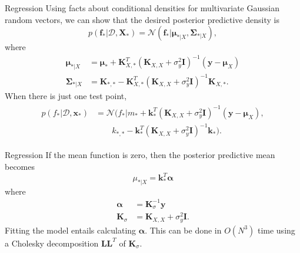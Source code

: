 \documentclass{beamer}
\begin{document}
\begin{frame}{Regression}
    Using facts about conditional densities for multivariate Gaussian random vectors, we can show that the desired posterior predictive density is
    \[
    p(\boldsymbol{f}_* | \mathcal{D}, \boldsymbol{X}_*) = \mathcal{N}(\boldsymbol{f}_* | \boldsymbol{\mu}_{* | X}, \boldsymbol{\Sigma}_{* | X}),
    \]
    where
    \begin{align*}
        \boldsymbol{\mu}_{* | X} &= \boldsymbol{\mu}_* + \boldsymbol{K}_{X, *}^T(\boldsymbol{K}_{X, X} + \sigma_y^2 \boldsymbol{I})^{-1}(\boldsymbol{y} - \boldsymbol{\mu}_X) \\
        \boldsymbol{\Sigma}_{* | X} &= \boldsymbol{K}_{*, *} - \boldsymbol{K}_{X, *}^T(\boldsymbol{K}_{X, X} + \sigma_y^2 \boldsymbol{I})^{-1}\boldsymbol{K}_{X, *}.
    \end{align*}
    When there is just one test point,
    \begin{align*}
        \begin{split}
            p(f_* | \mathcal{D}, \boldsymbol{x}_*) &= \mathcal{N}(f_* | m_* + \boldsymbol{k}_*^T(\boldsymbol{K}_{X, X} + \sigma_y^2 \boldsymbol{I})^{-1}(\boldsymbol{y} - \boldsymbol{\mu}_X), \\
            &\qquad k_{*, *} - \boldsymbol{k}_*^T(\boldsymbol{K}_{X, X} + \sigma_y^2 \boldsymbol{I})^{-1}\boldsymbol{k}_*).
        \end{split}
    \end{align*}
\end{frame}

\begin{frame}{Regression}
    If the mean function is zero, then the posterior predictive mean becomes
    \[
    \mu_{* | X} = \boldsymbol{k}_*^T \boldsymbol{\alpha}
    \]
    where
    \begin{align*}
        \boldsymbol{\alpha} &= \boldsymbol{K}_{\sigma}^{-1}\boldsymbol{y} \\
        \boldsymbol{K}_{\sigma} &= \boldsymbol{K}_{X, X} + \sigma_y^2 \boldsymbol{I}.
    \end{align*}
    Fitting the model entails calculating $\boldsymbol{\alpha}$. This can be done in $O(N^3)$ time using a Cholesky decomposition $\boldsymbol{L}\boldsymbol{L}^T$ of $\boldsymbol{K}_{\sigma}$. 
\end{frame}
\end{document}
